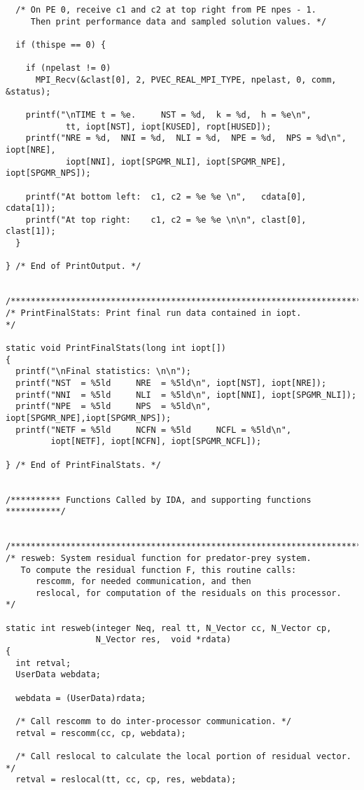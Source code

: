 \documentclass[11pt]{article}
\begin{document}
\begin{verbatim}
  /* On PE 0, receive c1 and c2 at top right from PE npes - 1.
     Then print performance data and sampled solution values. */

  if (thispe == 0) {

    if (npelast != 0)
      MPI_Recv(&clast[0], 2, PVEC_REAL_MPI_TYPE, npelast, 0, comm, &status);

    printf("\nTIME t = %e.     NST = %d,  k = %d,  h = %e\n",
            tt, iopt[NST], iopt[KUSED], ropt[HUSED]);
    printf("NRE = %d,  NNI = %d,  NLI = %d,  NPE = %d,  NPS = %d\n",  iopt[NRE],
            iopt[NNI], iopt[SPGMR_NLI], iopt[SPGMR_NPE], iopt[SPGMR_NPS]);

    printf("At bottom left:  c1, c2 = %e %e \n",   cdata[0], cdata[1]);
    printf("At top right:    c1, c2 = %e %e \n\n", clast[0], clast[1]);
  }

} /* End of PrintOutput. */


/*************************************************************************/
/* PrintFinalStats: Print final run data contained in iopt.              */

static void PrintFinalStats(long int iopt[])
{
  printf("\nFinal statistics: \n\n");
  printf("NST  = %5ld     NRE  = %5ld\n", iopt[NST], iopt[NRE]);
  printf("NNI  = %5ld     NLI  = %5ld\n", iopt[NNI], iopt[SPGMR_NLI]);
  printf("NPE  = %5ld     NPS  = %5ld\n", iopt[SPGMR_NPE],iopt[SPGMR_NPS]);
  printf("NETF = %5ld     NCFN = %5ld     NCFL = %5ld\n",
         iopt[NETF], iopt[NCFN], iopt[SPGMR_NCFL]);

} /* End of PrintFinalStats. */


/********** Functions Called by IDA, and supporting functions  ***********/


/*************************************************************************/
/* resweb: System residual function for predator-prey system.
   To compute the residual function F, this routine calls:
      rescomm, for needed communication, and then
      reslocal, for computation of the residuals on this processor.      */

static int resweb(integer Neq, real tt, N_Vector cc, N_Vector cp, 
                  N_Vector res,  void *rdata)
{
  int retval;
  UserData webdata;

  webdata = (UserData)rdata;

  /* Call rescomm to do inter-processor communication. */
  retval = rescomm(cc, cp, webdata);

  /* Call reslocal to calculate the local portion of residual vector. */
  retval = reslocal(tt, cc, cp, res, webdata);


\end{verbatim}
\end{document}
